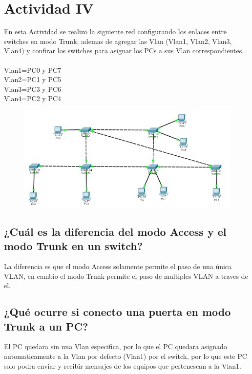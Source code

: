 \documentclass[spanish]{udpreport}
\begin{document}
\section{Actividad IV}
En esta Actividad se realizo la siguiente red configurando los enlaces entre switches en modo Trunk, ademas de agregar las Vlan (Vlan1, Vlan2, Vlan3, Vlan4)
y confirar los switches para asignar los PCs a sus Vlan correspondientes.\\\\
Vlan1=PC0 y PC7\\
Vlan2=PC1 y PC5\\
Vlan3=PC3 y PC6\\
Vlan4=PC2 y PC4\\
\begin{figure}[H]
\begin{center}
\includegraphics[scale=0.65]{images/VLAN.PNG}
\end{center}
\end{figure}

\subsection{¿Cuál es la diferencia del modo Access y el modo Trunk en un switch?}
La diferencia es que el modo Access solamente permite el paso de una única VLAN, en cambio el modo Trunk permite el paso de multiples VLAN a traves de el.\\

\subsection{¿Qué ocurre si conecto una puerta en modo Trunk a un PC?}
El PC quedara sin una Vlan especifica, por lo que el PC quedara asignado automaticamente a la Vlan por defecto (Vlan1) por el switch, por lo que este PC solo podra enviar y recibir mensajes de los equipos que pertenescan a la Vlan1.
\end{document}
